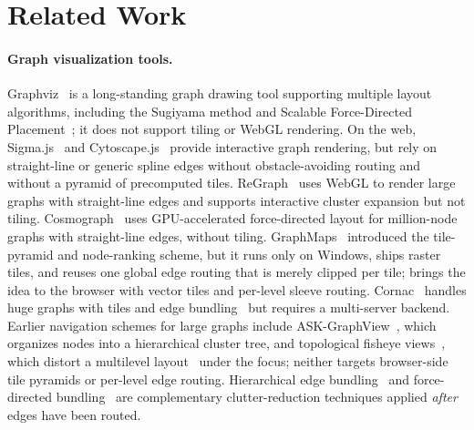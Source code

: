 \section{Related Work}
\label{sec:related}

\paragraph{Graph visualization tools.}
Graphviz~\cite{gansner2000graphviz,graphviz} is a long-standing graph
drawing tool supporting multiple layout algorithms, including the
Sugiyama method and Scalable Force-Directed Placement~\cite{sfdp}; it
does not support tiling or WebGL rendering.  On the web,
Sigma.js~\cite{sigmajs} and Cytoscape.js~\cite{franz2016cytoscape}
provide interactive graph rendering, but rely on straight-line or
generic spline edges without obstacle-avoiding routing and without a
pyramid of precomputed tiles. ReGraph~\cite{regraph} uses WebGL to
render large graphs with straight-line edges and supports interactive
cluster expansion but not tiling. Cosmograph~\cite{cosmograph} uses
GPU-accelerated force-directed layout for million-node graphs with
straight-line edges, without
tiling. GraphMaps~\cite{nachmanson2015graphmaps} introduced the
tile-pyramid and node-ranking scheme, but it runs
only on Windows, ships raster tiles, and reuses one global edge
routing that is merely clipped per tile; \msagljs{} brings the idea to
the browser with vector tiles and per-level sleeve routing. Cornac~\cite{perrot2018cornac} handles huge
graphs with tiles and edge
bundling~\cite{hurter2012graph,holten2009fdeb} but requires a
multi-server backend. Earlier navigation schemes for large graphs
include ASK-GraphView~\cite{abello2006askgraphview}, which organizes
nodes into a hierarchical cluster tree, and topological fisheye
views~\cite{gansner2005topological}, which distort a multilevel
layout~\cite{harel2002multiscale,hu2005efficient} under the focus;
neither targets browser-side tile pyramids or per-level edge
routing. Hierarchical edge bundling~\cite{holten2006hierarchical}
and force-directed bundling~\cite{holten2009fdeb} are complementary
clutter-reduction techniques applied \emph{after} edges have been
routed.

